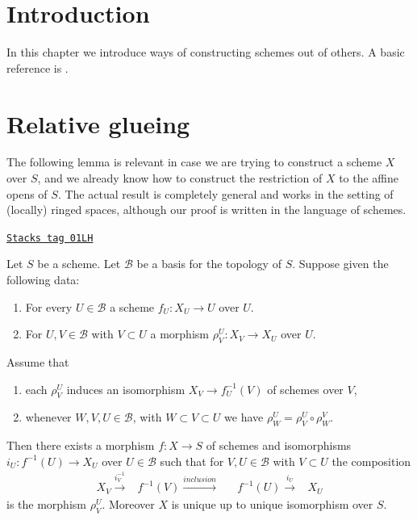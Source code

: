 \section{Introduction}
\label{constructions-section-introduction}
In this chapter we introduce ways of constructing schemes out of others.
A basic reference is \cite{EGA}.

\section{Relative glueing}
\label{constructions-section-relative-glueing}
The following lemma is relevant in case we are trying to construct a
scheme $X$ over $S$, and we already know how to construct the restriction
of $X$ to the affine opens of $S$. The actual result is completely general
and works in the setting of (locally) ringed spaces, although our proof
is written in the language of schemes.

\begin{lemma}
\label{constructions-lemma-relative-glueing}
\href{https://stacks.math.columbia.edu/tag/01LH}{\texttt{Stacks tag 01LH}}

Let $S$ be a scheme.
Let $\mathcal{B}$ be a basis for the topology of $S$.
Suppose given the following data:
\begin{enumerate}
\item For every $U \in \mathcal{B}$ a scheme $f_U : X_U \to U$ over $U$.
\item For $U, V \in \mathcal{B}$ with $V \subset U$ a morphism
$\rho^U_V : X_V \to X_U$ over $U$.
\end{enumerate}
Assume that
\begin{enumerate}
\item[(a)] each $\rho^U_V$ induces an isomorphism
$X_V \to f_U^{-1}(V)$ of schemes over $V$,
\item[(b)] whenever $W, V, U \in \mathcal{B}$, with
$W \subset V \subset U$ we have $\rho^U_W = \rho^U_V \circ \rho ^V_W$.
\end{enumerate}
Then there exists a morphism $f : X \to S$ of schemes
and isomorphisms $i_U : f^{-1}(U) \to X_U$ over $U \in \mathcal{B}$
such that for $V, U \in \mathcal{B}$ with $V \subset U$ the composition
$$
\begin{array}{ccccc}X_V \overset{i_V^{-1}}{\longrightarrow} & f^{-1}(V) \overset{inclusion}{\longrightarrow} &  & f^{-1}(U) \overset{i_U}{\longrightarrow} & X_U\end{array}
$$
is the morphism $\rho^U_V$. Moreover $X$ is unique up to
unique isomorphism over $S$.
\end{lemma}

